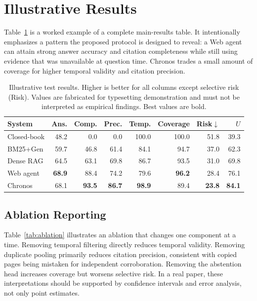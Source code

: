 \section{Illustrative Results}
\label{sec:results}

Table~\ref{tab:results} is a worked example of a complete main-results table.
It intentionally emphasizes a pattern the proposed protocol is designed to
reveal: a Web agent can attain strong answer accuracy and citation completeness
while still using evidence that was unavailable at question time.  Chronos
trades a small amount of coverage for higher temporal validity and citation
precision.

\begin{table}[t]
  \caption{Illustrative test results.  Higher is better for all columns except
  selective risk (Risk).  Values are fabricated for typesetting demonstration
  and must not be interpreted as empirical findings.  Best values are bold.}
  \label{tab:results}
  \centering
  \small
  \begin{tabular}{@{}lrrrrrrr@{}}
    \toprule
    System & Ans. & Comp. & Prec. & Temp. & Coverage & Risk$\downarrow$ & $U$ \\
    \midrule
    Closed-book & 48.2 & 0.0  & 0.0  & 100.0 & 100.0 & 51.8 & 39.3 \\
    BM25+Gen    & 59.7 & 46.8 & 61.4 & 84.1  & 94.7  & 37.0 & 62.3 \\
    Dense RAG   & 64.5 & 63.1 & 69.8 & 86.7  & 93.5  & 31.0 & 69.8 \\
    Web agent   & \textbf{68.9} & 88.4 & 74.2 & 79.6 & \textbf{96.2} & 28.4 & 76.1 \\
    Chronos     & 68.1 & \textbf{93.5} & \textbf{86.7} & \textbf{98.9}
                & 89.4 & \textbf{23.8} & \textbf{84.1} \\
    \bottomrule
  \end{tabular}
\end{table}

\subsection{Ablation Reporting}

Table~\ref{tab:ablation} illustrates an ablation that changes one component at a
time.  Removing temporal filtering directly reduces temporal validity.  Removing
duplicate pooling primarily reduces citation precision, consistent with copied
pages being mistaken for independent corroboration.  Removing the abstention
head increases coverage but worsens selective risk.  In a real paper, these
interpretations should be supported by confidence intervals and error analysis,
not only point estimates.

